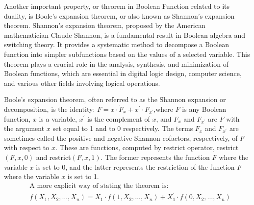     Another important property, or theorem in Boolean Function related to its duality, is Boole's expansion theorem, or also known as Shannon's expansion theorem.
    Shannon's expansion theorem, proposed by the American mathematician Claude Shannon, is a fundamental result in Boolean algebra and switching theory. 
    It provides a systematic method to decompose a Boolean function into simpler subfunctions based on the values of a selected variable. 
    This theorem plays a crucial role in the analysis, synthesis, and minimization of Boolean functions, which are essential in digital logic design, computer 
    science, and various other fields involving logical operations.

    \begin{theorem}
        Boole's expansion theorem, often referred to as the Shannon expansion or decomposition, is the identity: $F=x\cdot\dot{F}_x+x^{\prime}\cdot F_{x^{\prime}}$,where $F$ is any Boolean function, $x$ is a variable, $x^{\prime}$ is the complement of $x$, and $F_x$ and $F_{x^{\prime}}$ are $F$
        with the argument $x$ set equal to 1 and to 0 respectively.
        The terms $F_x$ and $F_{x^{\prime}}$ are sometimes called the positive and negative Shannon cofactors, respectively, of $F$ with respect to
        $x$. These are functions, computed by restrict operator, restrict$(F,x,0)$ and restrict$(F,x,1)$. The former represents  the function $F$ where the variable $x$  
        is set to 0, and the latter represents the restriction of the function $F$ where the variable $x$ is set to 1.
        $$\begin{aligned}&\text{A more explicit way of stating the theorem is:}\\&f(X_1,X_2,\ldots,X_n)=X_1\cdot f(1,X_2,\ldots,X_n)+X_1^{\prime}\cdot f(0,X_2,\ldots,X_n)\end{aligned}$$
    \end{theorem}
